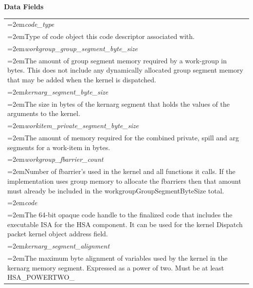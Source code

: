 \documentclass[final,oneside]{book}
\newcommand{\reffld}[1]{\textit{#1}}
\begin{document}
\noindent\textbf{Data Fields}\\[-6mm]
\begin{longtable}{@{}>{\hangindent=2em}p{\textwidth}}
\hypertarget{hsa_\-ext_\-code_\-descriptor_\-t.code_\-type}{\reffld{code_\-type}}\\\hspace{2em}Type of code object this code descriptor associated with.\\[2mm]
\hypertarget{hsa_\-ext_\-code_\-descriptor_\-t.workgroup_\-group_\-segment_\-byte_\-size}{\reffld{workgroup_\-group_\-segment_\-byte_\-size}}\\\hspace{2em}The amount of group segment memory required by a work-group in bytes. This does not include any dynamically allocated group segment memory that may be added when the kernel is dispatched.\\[2mm]
\hypertarget{hsa_\-ext_\-code_\-descriptor_\-t.kernarg_\-segment_\-byte_\-size}{\reffld{kernarg_\-segment_\-byte_\-size}}\\\hspace{2em}The size in bytes of the kernarg segment that holds the values of the arguments to the kernel.\\[2mm]
\hypertarget{hsa_\-ext_\-code_\-descriptor_\-t.workitem_\-private_\-segment_\-byte_\-size}{\reffld{workitem_\-private_\-segment_\-byte_\-size}}\\\hspace{2em}The amount of memory required for the combined private, spill and arg segments for a work-item in bytes.\\[2mm]
\hypertarget{hsa_\-ext_\-code_\-descriptor_\-t.workgroup_\-fbarrier_\-count}{\reffld{workgroup_\-fbarrier_\-count}}\\\hspace{2em}Number of fbarrier's used in the kernel and all functions it calls. If the implementation uses group memory to allocate the fbarriers then that amount must already be included in the workgroupGroupSegmentByteSize total.\\[2mm]
\hypertarget{hsa_\-ext_\-code_\-descriptor_\-t.code}{\reffld{code}}\\\hspace{2em}The 64-bit opaque code handle to the finalized code that includes the executable ISA for the HSA component. It can be used for the kernel Dispatch packet kernel object address field.\\[2mm]
\hypertarget{hsa_\-ext_\-code_\-descriptor_\-t.kernarg_\-segment_\-alignment}{\reffld{kernarg_\-segment_\-alignment}}\\\hspace{2em}The maximum byte alignment of variables used by the kernel in the kernarg memory segment. Expressed as a power of two. Must be at least HSA_\-POWERTWO_\-16\\[2mm]

\end{longtable}
\end{document}
